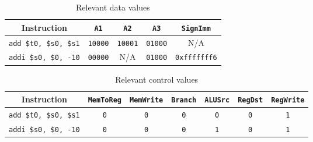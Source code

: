 \documentclass[11pt]{article}
\def\code#1{\texttt{#1}}
\begin{document}
\begin{table}[H]
\renewcommand{\arraystretch}{1.2}
\setlength{\tabcolsep}{12pt}
\caption{Relevant data values}
\begin{center}
\begin{tabular}{|c||c|c|c|c|}\hline
Instruction & \code{A1} & \code{A2} & \code{A3} & \code{SignImm} \\\hline
\code{add \$t0, \$s0, \$s1} & \code{10000} & \code{10001} & \code{01000} & N/A\\\hline
\code{addi \$s0, \$0, -10} & \code{00000} & N/A & \code{01000} & \code{0xfffffff6}\\\hline
\end{tabular}
\end{center}
\label{tab:TRUTH}
\end{table}

\begin{table}[H]
\renewcommand{\arraystretch}{1.2}
\setlength{\tabcolsep}{12pt}
\caption{Relevant control values}
\begin{center}
\begin{tabular}{|c||c|c|c|c|c|c|}\hline
Instruction & \code{MemToReg} & \code{MemWrite} & \code{Branch} & \code{ALUSrc} & \code{RegDst} & \code{RegWrite} \\\hline
\code{add \$t0, \$s0, \$s1} & \code{0} & \code{0} & \code{0} & \code{0} & \code{0} & \code{1} \\\hline
\code{addi \$s0, \$0, -10} & \code{0} & \code{0} & \code{0} & \code{1} & \code{0} & \code{1} \\\hline
\end{tabular}
\end{center}
\label{tab:TRUTH}
\end{table}
\end{document}
